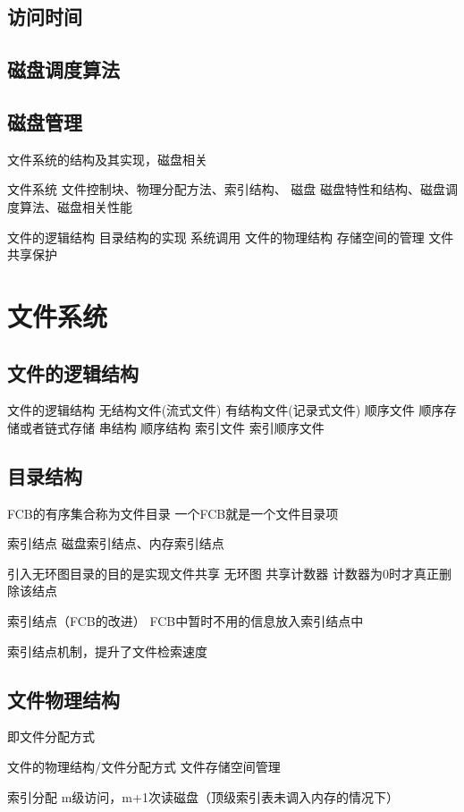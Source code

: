 \subsection{访问时间}
\subsection{磁盘调度算法}
\subsection{磁盘管理}


文件系统的结构及其实现，磁盘相关

文件系统
文件控制块、物理分配方法、索引结构、
磁盘
磁盘特性和结构、磁盘调度算法、磁盘相关性能

文件的逻辑结构
目录结构的实现
系统调用
文件的物理结构
存储空间的管理
文件共享保护

\section{文件系统}

\subsection{文件的逻辑结构}
文件的逻辑结构
	无结构文件(流式文件) 
	有结构文件(记录式文件) 
		顺序文件
			顺序存储或者链式存储
			串结构 顺序结构 
		索引文件
		索引顺序文件

\subsection{目录结构}
FCB的有序集合称为文件目录
一个FCB就是一个文件目录项

索引结点
磁盘索引结点、内存索引结点

引入无环图目录的目的是实现文件共享
无环图 共享计数器 计数器为0时才真正删除该结点


索引结点（FCB的改进）
FCB中暂时不用的信息放入索引结点中

索引结点机制，提升了文件检索速度


\subsection{文件物理结构}
即文件分配方式

文件的物理结构/文件分配方式
文件存储空间管理

索引分配
m级访问，m+1次读磁盘（顶级索引表未调入内存的情况下）

